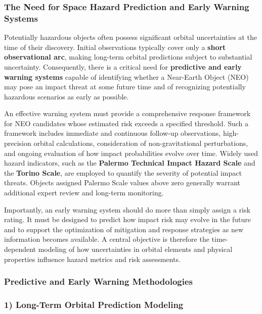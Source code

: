 \subsubsection{The Need for Space Hazard Prediction and Early Warning Systems}

Potentially hazardous objects often possess significant orbital uncertainties at the time of their discovery. Initial observations typically cover only a \textbf{short observational arc}, making long-term orbital predictions subject to substantial uncertainty. Consequently, there is a critical need for \textbf{predictive and early warning systems} capable of identifying whether a Near-Earth Object (NEO) may pose an impact threat at some future time and of recognizing potentially hazardous scenarios as early as possible.

An effective warning system must provide a comprehensive response framework for NEO candidates whose estimated risk exceeds a specified threshold. Such a framework includes immediate and continuous follow-up observations, high-precision orbital calculations, consideration of non-gravitational perturbations, and ongoing evaluation of how impact probabilities evolve over time. Widely used hazard indicators, such as the \textbf{Palermo Technical Impact Hazard Scale} and the \textbf{Torino Scale}, are employed to quantify the severity of potential impact threats. Objects assigned Palermo Scale values above zero generally warrant additional expert review and long-term monitoring.

Importantly, an early warning system should do more than simply assign a risk rating. It must be designed to predict how impact risk may evolve in the future and to support the optimization of mitigation and response strategies as new information becomes available. A central objective is therefore the time-dependent modeling of how uncertainties in orbital elements and physical properties influence hazard metrics and risk assessments.

\subsubsection{Predictive and Early Warning Methodologies}

\subsubsection{1) Long-Term Orbital Prediction Modeling}\label{long-term-orbital-prediction-modeling}

